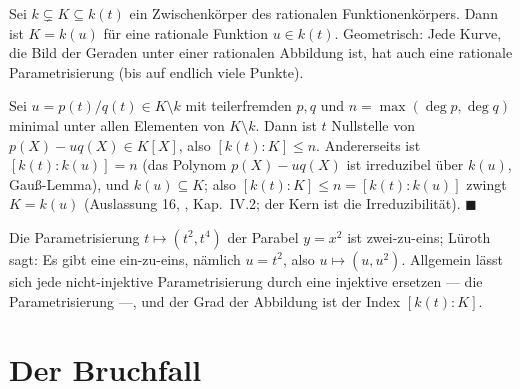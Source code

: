 \begin{merksatz}
Sei $k\subsetneq K\subseteq k(t)$ ein Zwischenkörper des rationalen Funktionenkörpers. Dann ist $K = k(u)$ für eine rationale Funktion $u\in k(t)$. Geometrisch: Jede Kurve, die Bild der Geraden unter einer rationalen Abbildung ist, hat auch eine  rationale Parametrisierung (bis auf endlich viele Punkte).

Sei $u = p(t)/q(t)\in K\setminus k$ mit teilerfremden $p, q$ und $n = \max(\deg p, \deg q)$ minimal unter allen Elementen von $K\setminus k$. Dann ist $t$ Nullstelle von $p(X) - uq(X)\in K[X]$, also $[k(t) : K]\le n$. Andererseits ist $[k(t) : k(u)] = n$ (das Polynom $p(X) - uq(X)$ ist irreduzibel über $k(u)$, Gauß-Lemma), und $k(u)\subseteq K$; also $[k(t) : K]\le n = [k(t) : k(u)]$ zwingt $K = k(u)$ (Auslassung 16, , Kap.~IV.2; der Kern ist die Irreduzibilität). $\blacksquare$

Die Parametrisierung $t\mapsto(t^{2}, t^{4})$ der Parabel $y = x^{2}$ ist zwei-zu-eins; Lüroth sagt: Es gibt eine ein-zu-eins, nämlich $u = t^{2}$, also $u\mapsto(u, u^{2})$. Allgemein lässt sich jede nicht-injektive Parametrisierung durch eine injektive ersetzen --- die  Parametrisierung ---, und der Grad der Abbildung ist der Index $[k(t) : K]$.

\begin{center}
\begin{minipage}{0.88\textwidth}
\end{minipage}
\end{center}
\end{merksatz}

\section{Der Bruchfall}

